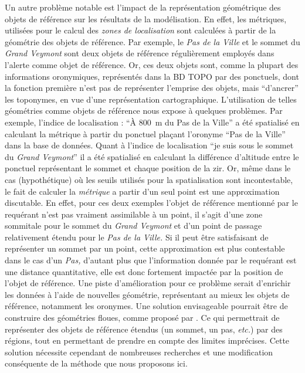 Un autre problème notable est l'impact de la représentation
géométrique des objets de référence sur les résultats de la
modélisation. En effet, les métriques, utilisées pour le calcul des
\emph{zones de localisation} sont calculées à partir de la géométrie
des objets de référence. Par exemple, le \emph{Pas de la Ville} et le
sommet du \emph{Grand Veymont} sont deux objets de référence
régulièrement employés dans l'alerte comme objet de référence. Or, ces
deux objets sont, comme la plupart des informations oronymiques,
représentés dans la BD TOPO par des ponctuels, dont la fonction
première n'est pas de représenter l'emprise des objets, mais
\enquote{d'ancrer} les toponymes, en vue d'une représentation
cartographique. L'utilisation de telles géométries comme objets de
référence nous expose à quelques problèmes. Par exemple, l'indice de
localisation : \enquote{À \SI{800}{\meter} du Pas de la Ville} a été
spatialisé en calculant la métrique  à partir du
ponctuel plaçant l'oronyme \enquote{Pas de la Ville} dans la base de
données. Quant à l'indice de localisation \enquote{je suis sous le
  sommet du \emph{Grand Veymont}} il a été spatialisé en calculant la
différence d'altitude entre le ponctuel représentant le sommet et
chaque position de la \ac{zir}. Or, même dans le cas (hypothétique) où
les seuils utilisés pour la spatialisation sont incontestable, le fait
de calculer la \emph{métrique} a partir d'un seul point est une
approximation discutable. En effet, pour ces deux exemples l'objet de
référence mentionné par le requérant n'est pas vraiment assimilable à
un point, il s'agit d'une zone sommitale pour le sommet du \emph{Grand
  Veymont} et d'un point de passage relativement étendu pour le
\emph{Pas de la Ville.} Si il peut être satisfaisant de représenter un
sommet par un point, cette approximation est plus contestable dans le
cas d'un \emph{Pas,} d'autant plus que l'information donnée par le
requérant est une distance quantitative, elle est donc fortement
impactée par la position de l'objet de référence. Une piste
d'amélioration pour ce problème serait d’enrichir les données à l'aide
de nouvelles géométrie, représentant au mieux les objets de référence,
notamment les oronymes. Une solution envisageable pourrait être de
construire des géométries floues, comme proposé par
\textcite{Bloch1996}. Ce qui permettrait de représenter des objets de
référence étendus (\eg un sommet, un pas, \emph{etc.}) par des
régions, tout en permettant de prendre en compte des limites
imprécises.  Cette solution nécessite cependant de nombreuses
recherches et une modification conséquente de la méthode que nous
proposons ici.

